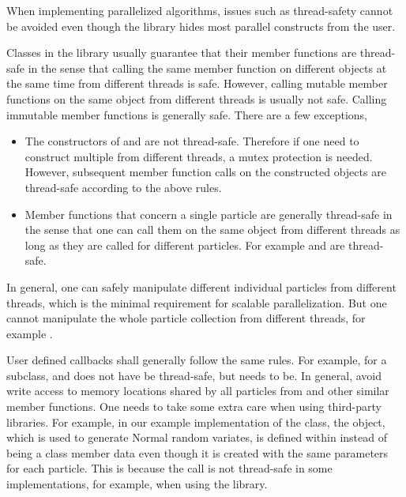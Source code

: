 When implementing parallelized \smc algorithms, issues such as thread-safety
cannot be avoided even though the \vsmc library hides most parallel constructs
from the user.

Classes in the \vsmc library usually guarantee that their member functions are
thread-safe in the sense that calling the same member function on different
objects at the same time from different threads is safe. However, calling
mutable member functions on the same object from different threads is usually
not safe. Calling immutable member functions is generally safe. There are a
few exceptions,
\begin{itemize}
  \item The constructors of  and  are
    not thread-safe. Therefore if one need to construct multiple
     from different threads, a mutex protection is needed.
    However, subsequent member function calls on the constructed objects are
    thread-safe according to the above rules.
  \item Member functions that concern a single particle are generally
    thread-safe in the sense that one can call them on the same object from
    different threads as long as they are called for different particles. For
    example  and  are
    thread-safe.
\end{itemize}
In general, one can safely manipulate different individual particles from
different threads, which is the minimal requirement for scalable
parallelization. But one cannot manipulate the whole particle collection from
different threads, for example .

User defined callbacks shall generally follow the same rules. For example, for
a  subclass,  and
 does not have be thread-safe, but
 needs to be. In general, avoid write access to memory
locations shared by all particles from  and other
similar member functions. One needs to take some extra care when using
third-party libraries. For example, in our example implementation of the
 class, the  object, which is used to
generate Normal random variates, is defined within 
instead of being a class member data even though it is created with the same
parameters for each particle. This is because the call
 is not thread-safe in some implementations, for
example, when using the \boost library.

